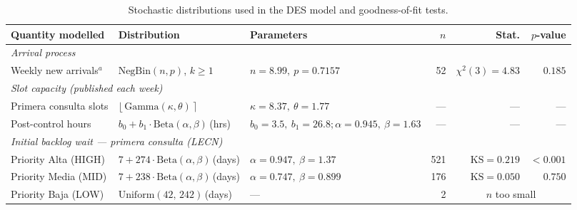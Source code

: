 
\begin{table}[htbp]
\centering
\caption{Stochastic distributions used in the DES model and goodness-of-fit tests.}
\label{tab:distributions}
\small
\begin{tabularx}{\textwidth}{l l l r r r}
\toprule
\textbf{Quantity modelled} & \textbf{Distribution} & \textbf{Parameters} & \textbf{$n$} & \textbf{Stat.} & \textbf{$p$-value} \\
\midrule
\multicolumn{6}{l}{\textit{Arrival process}} \\[2pt]
Weekly new arrivals$^a$ & $\mathrm{NegBin}(n,p)$, $k\!\ge\!1$ & $n{=}8.99,\ p{=}0.7157$ & 52 & $\chi^2(3){=}4.83$ & $0.185$ \\[6pt]

\multicolumn{6}{l}{\textit{Slot capacity (published each week)}} \\[2pt]
Primera consulta slots & $\lfloor\,\mathrm{Gamma}(\kappa,\theta)\,\rceil$ & $\kappa{=}8.37,\ \theta{=}1.77$ & — & — & — \\
Post-control hours & $b_0 + b_1\cdot\mathrm{Beta}(\alpha,\beta)$\,(hrs) & $b_0{=}3.5,\ b_1{=}26.8;$\quad$\alpha{=}0.945,\ \beta{=}1.63$ & — & — & — \\[6pt]

\multicolumn{6}{l}{\textit{Initial backlog wait — primera consulta (LECN)}} \\[2pt]
Priority Alta (HIGH) & $7 + 274\cdot\mathrm{Beta}(\alpha,\beta)$\,(days) & $\alpha{=}0.947,\ \beta{=}1.37$ & 521 & $\mathrm{KS}{=}0.219$ & ${<}0.001$ \\
Priority Media (MID) & $7 + 238\cdot\mathrm{Beta}(\alpha,\beta)$\,(days) & $\alpha{=}0.747,\ \beta{=}0.899$ & 176 & $\mathrm{KS}{=}0.050$ & $0.750$ \\
Priority Baja (LOW) & $\mathrm{Uniform}(42,\,242)$\,(days) & — & 2 & \multicolumn{2}{c}{$n$ too small} \\[6pt]


\end{tabularx}
\end{table}
